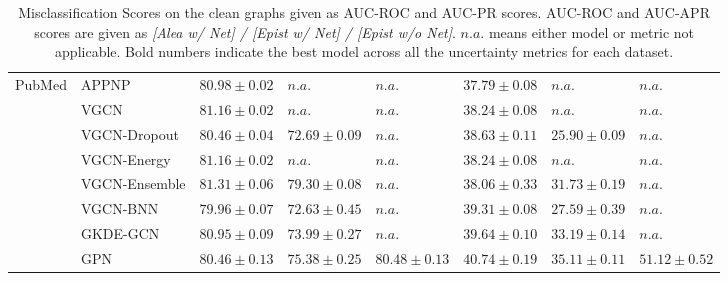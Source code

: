 \begin{table}[ht]
{\begin{tabular}{ll|lll|lll}
              \multirow{8}{*}{PubMed} 
               &          APPNP &    $80.98 \pm 0.02$ &               $n.a.$ &                $n.a.$ &   $37.79 \pm 0.08$ &              $n.a.$ &               $n.a.$ \\
               &           VGCN &    $81.16 \pm 0.02$ &               $n.a.$ &                $n.a.$ &   $38.24 \pm 0.08$ &              $n.a.$ &               $n.a.$ \\
               &   VGCN-Dropout &    $80.46 \pm 0.04$ &    $72.69 \pm 0.09$ &                $n.a.$ &   $38.63 \pm 0.11$ &   $25.90 \pm 0.09$ &               $n.a.$ \\
               &    VGCN-Energy &    $81.16 \pm 0.02$ &               $n.a.$ &                $n.a.$ &   $38.24 \pm 0.08$ &              $n.a.$ &               $n.a.$ \\
               &  VGCN-Ensemble &    $\mathbf{81.31 \pm 0.06}$ &    $79.30 \pm 0.08$ &                $n.a.$ &   $38.06 \pm 0.33$ &   $31.73 \pm 0.19$ &               $n.a.$ \\
               &       VGCN-BNN &    $79.96 \pm 0.07$ &    $72.63 \pm 0.45$ &                $n.a.$ &   $39.31 \pm 0.08$ &   $27.59 \pm 0.39$ &               $n.a.$ \\
               &        GKDE-GCN &    $80.95 \pm 0.09$ &    $73.99 \pm 0.27$ &                $n.a.$ &   $39.64 \pm 0.10$ &   $33.19 \pm 0.14$ &               $n.a.$ \\
               &            GPN &    $80.46 \pm 0.13$ &    $75.38 \pm 0.25$ &     $80.48 \pm 0.13$ &   $40.74 \pm 0.19$ &   $35.11 \pm 0.11$ &    $\mathbf{51.12 \pm 0.52}$ \\
     
    \bottomrule
    \end{tabular}}
    \vspace{1em}
    \caption{Misclassification Scores on the clean graphs given as AUC-ROC and AUC-PR scores. AUC-ROC and AUC-APR scores are given as \emph{[Alea w/ Net] / [Epist w/ Net] / [Epist w/o Net]}. $n.a.$ means either model or metric not applicable. Bold numbers indicate the best model across all the uncertainty metrics for each dataset.}
    \label{tab:misclassification-one}
\end{table}

